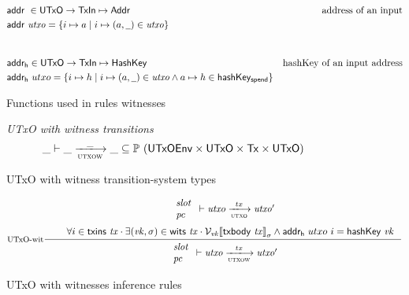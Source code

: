 \documentclass[11pt,a4paper]{article}
\newcommand{\Tx}{\type{Tx}}
\newcommand{\Addr}{\type{Addr}}
\newcommand{\UTxO}{\type{UTxO}}
\newcommand{\TxIn}{\type{TxIn}}
\newcommand{\HashKey}{\type{HashKey}}
\newcommand{\UTxOEnv}{\type{UTxOEnv}}
\newcommand{\txins}[1]{\fun{txins}~ \var{#1}}
\newcommand{\wits}[1]{\fun{wits}~ \var{#1}}
\newcommand{\serialised}[1]{\llbracket \var{#1} \rrbracket}
\newcommand{\addr}[1]{\fun{addr}~ \var{#1}}
\newcommand{\hashKey}[1]{\fun{hashKey}~ \var{#1}}
\newcommand{\txbody}[1]{\fun{txbody}~ \var{#1}}
\newcommand{\wcard}[0]{\underline{\phantom{a}}}
\theoremstyle{definition}
\theoremstyle{definition}
\begin{document}
\begin{figure}
  \begin{align*}
    & \addr{}{} \in \UTxO \to \TxIn \mapsto \Addr & \text{address of an input}\\
    & \addr{utxo} = \{ i \mapsto a \mid i \mapsto (a, \wcard) \in \var{utxo} \} \\
    \nextdef
    & \fun{addr_h} \in \UTxO \to \TxIn \mapsto \HashKey & \text{hashKey of an input address}\\
    & \fun{addr_h}~utxo = \{ i \mapsto h \mid i \mapsto (a, \wcard) \in \var{utxo}
      \wedge a \mapsto h \in \fun{hashKey_{spend}} \}
  \end{align*}
  \caption{Functions used in rules witnesses}
  \label{fig:derived-defs:utxow}
\end{figure}

\begin{figure}
  \emph{UTxO with witness transitions}
  \begin{equation*}
    \var{\_} \vdash
    \var{\_} \trans{utxow}{\_} \var{\_}
    \subseteq \powerset (\UTxOEnv \times \UTxO \times \Tx \times \UTxO)
  \end{equation*}
  \caption{UTxO with witness transition-system types}
  \label{fig:ts-types:utxow}
\end{figure}

\begin{figure}
  \begin{equation}
    \label{eq:utxo-witness-inductive}
    \inference[UTxO-wit]
    {
      {
        \begin{array}{l}
        \var{slot}\\
        \var{pc}
        \end{array}
      }
      \vdash \var{utxo} \trans{utxo}{tx} \var{utxo'}\\ ~ \\
      & \forall i \in \txins{tx} \cdot \exists (\var{vk}, \sigma) \in \wits{\var{tx}}
      \cdot
      \mathcal{V}_{\var{vk}}{\serialised{\txbody{tx}}}_{\sigma}
      \wedge  \fun{addr_h}~{utxo}~i = \hashKey{vk}\\
    }
    {
      \begin{array}{l}
        \var{slot}\\
        \var{pc}\\
      \end{array}
      \vdash \var{utxo} \trans{utxow}{tx} \var{utxo'}
    }
  \end{equation}
  \caption{UTxO with witnesses inference rules}
  \label{fig:rules:utxow}
\end{figure}
\end{document}
